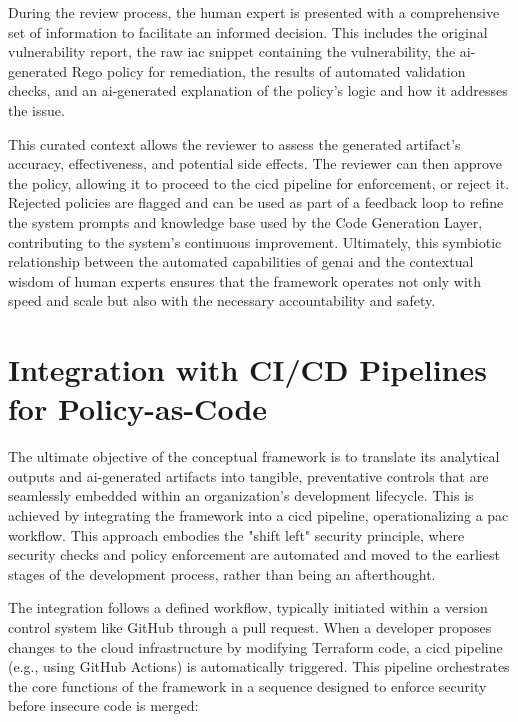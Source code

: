 During the review process, the human expert is presented with a comprehensive set of information to facilitate an informed decision. This includes the original vulnerability report, the raw \gls{iac} snippet containing the vulnerability, the \gls{ai}-generated Rego policy for remediation, the results of automated validation checks, and an \gls{ai}-generated explanation of the policy’s logic and how it addresses the issue.

This curated context allows the reviewer to assess the generated artifact's accuracy, effectiveness, and potential side effects. The reviewer can then approve the policy, allowing it to proceed to the \gls{cicd} pipeline for enforcement, or reject it. Rejected policies are flagged and can be used as part of a feedback loop to refine the system prompts and knowledge base used by the Code Generation Layer, contributing to the system's continuous improvement\cite{zanzotto_human---loop_2019, wu_survey_2022}. Ultimately, this symbiotic relationship between the automated capabilities of \gls{genai} and the contextual wisdom of human experts ensures that the framework operates not only with speed and scale but also with the necessary accountability and safety.


\section{Integration with CI/CD Pipelines for Policy-as-Code} %
\label{sec:Integration with CI/CD Pipelines for Policy-as-Code}

The ultimate objective of the conceptual framework is to translate its analytical outputs and \gls{ai}-generated artifacts into tangible, preventative controls that are seamlessly embedded within an organization's development lifecycle. This is achieved by integrating the framework into a \gls{cicd} pipeline, operationalizing a \gls{pac} workflow. This approach embodies the "shift left" security principle, where security checks and policy enforcement are automated and moved to the earliest stages of the development process, rather than being an afterthought.

The integration follows a defined workflow, typically initiated within a version control system like GitHub through a pull request. When a developer proposes changes to the cloud infrastructure by modifying Terraform code, a \gls{cicd} pipeline (e.g., using GitHub Actions) is automatically triggered. This pipeline orchestrates the core functions of the framework in a sequence designed to enforce security before insecure code is merged:

